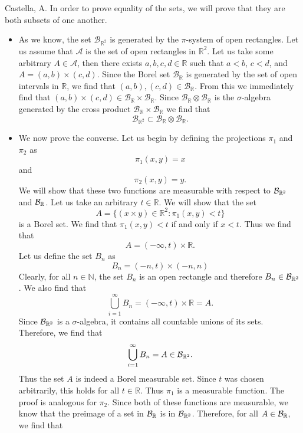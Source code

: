 \begin{solution}[2.14]{Castella, A.}
    In order to prove equality of the sets, we will prove that they are both subsets of one another.
    \begin{itemize}
        \item As we know, the set $\mathcal{B}_{\mathbb{R}^2}$ is generated by the $\pi$-system of open rectangles. Let us assume that $\mathcal{A}$ is the set of open rectangles in $\mathbb{R}^2$. Let us take some arbitrary $A \in \mathcal{A}$, then there exists $a,b,c,d \in \mathbb{R}$ such that $a < b$, $c < d$, and $A = (a,b)\times(c,d)$. Since the Borel set $\mathcal{B}_\mathbb{R}$ is generated by the set of open intervals in $\mathbb{R}$, we find that $(a,b), (c,d) \in \mathcal{B}_\mathbb{R}$. From this we immediately find that $(a,b)\times(c,d) \in \mathcal{B}_\mathbb{R}\times\mathcal{B}_\mathbb{R}$. Since $\mathcal{B}_\mathbb{R}\otimes\mathcal{B}_\mathbb{R}$ is the $\sigma$-algebra generated by the cross product $\mathcal{B}_\mathbb{R}\times\mathcal{B}_\mathbb{R}$ we find that
        $$
            \mathcal{B}_{\mathbb{R}^2} \subset \mathcal{B}_\mathbb{R}\otimes\mathcal{B}_\mathbb{R}.
        $$
        \item We now prove the converse. Let us begin by defining the projections $\pi_1$ and $\pi_2$ as
        $$
            \pi_1(x,y) = x
        $$
        and
        $$
            \pi_2(x,y) = y.
        $$
        We will show that these two functions are measurable with respect to $\mathcal B_{\mathbb R^2}$ and $\mathcal B_{\mathbb R}$. Let us take an arbitrary $t \in \mathbb{R}$. We will show that the set
        $$
            A = \{(x\times y) \in \mathbb{R}^2 : \pi_1(x,y) < t\}
        $$
        is a Borel set. We find that $\pi_1(x,y) < t$ if and only if $x < t$. Thus we find that
        $$
            A = (-\infty, t) \times \mathbb{R}.
        $$
        Let us define the set $B_n$ as
        $$
            B_n = (-n,t) \times (-n,n)
        $$
        Clearly, for all $n\in\mathbb{N}$, the set $B_n$ is an open rectangle and therefore $B_n \in \mathcal B_{\mathbb R^2}$. We also find that
        $$
            \bigcup_{i=1}^\infty B_n = (-\infty,t)\times \mathbb{R} = A.
        $$
        Since $\mathcal B_{\mathbb R^2}$ is a $\sigma$-algebra, it contains all countable unions of its sets. Therefore, we find that
        $$
            \bigcup_{i=1}^\infty B_n = A \in \mathcal B_{\mathbb R^2}.
        $$
        Thus the set $A$ is indeed a Borel measurable set. Since $t$ was chosen arbitrarily, this holds for all $t \in \mathbb{R}$. Thus $\pi_1$ is a measurable function. The proof is analogous for $\pi_2$. Since both of these functions are measurable, we know that the preimage of a set in $\mathcal B_{\mathbb R}$ is in $\mathcal B_{\mathbb R^2}$. Therefore, for all $A \in \mathcal B_{\mathbb R}$, we find that

\end{itemize}
\end{solution}
